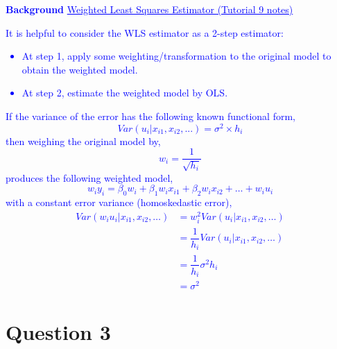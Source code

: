 \documentclass[12pt]{report}
\newenvironment{blueframed}[1][blue]
{\def\FrameCommand{\fboxsep=\FrameSep\fcolorbox{#1}{white}}%
\MakeFramed {\advance\hsize-\width \FrameRestore}}
{\endMakeFramed}
\begin{document}
\justify
\begin{blueframed}
	\textcolor{blue}{\textbf{Background}}
	\vspace{-\baselineskip}
	\justify
	\textcolor{blue}{\underline{Weighted Least Squares Estimator (Tutorial 9 notes)}}
	
	\noindent \textcolor{blue}
	{
		\noindent It is helpful to consider the WLS estimator as a 2-step estimator:  \begin{itemize}
			\item At step 1, apply some weighting/transformation to the original model to obtain the weighted model.
			\item At step 2, estimate the weighted model by OLS.
		\end{itemize} If the variance of the error has the following known functional form,
		$$Var(u_i|x_{i1},x_{i2},...) = \sigma^2 \times h_i$$
		\noindent then weighing the original model by,
		$$w_i = \dfrac{1}{\sqrt{h_i}}$$
		\noindent produces the following weighted model, $$w_iy_i = \beta_0w_i + \beta_1w_ix_{i1} + \beta_2w_ix_{i2} + \dots + w_iu_i$$ with a constant error variance 		(homoskedastic error),
		\begin{align*}
		Var(w_iu_i|x_{i1},x_{i2},\dots) &= w^2_iVar(u_i|x_{i1},x_{i2},\dots) \\
		&= \dfrac{1}{h_i}Var(u_i|x_{i1},x_{i2},\dots) \\
		&= \dfrac{1}{h_i}\sigma^2h_i \\
		&= \sigma^2
		\end{align*} \vspace{-\baselineskip}}
\end{blueframed}




\section*{Question 3}
\end{document}
